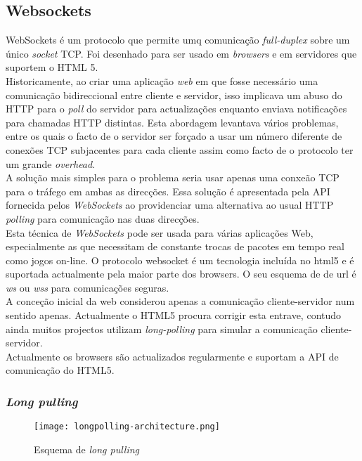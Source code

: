 \subsection{Websockets}
WebSockets é um protocolo que permite umq comunicação \textit{full-duplex} sobre um único \textit{socket} TCP. Foi desenhado para ser usado em \textit{browsers} e em servidores que suportem o HTML 5.\\
Historicamente, ao criar uma aplicação \textit{web} em que fosse necessário uma comunicação bidireccional entre cliente e servidor, isso implicava um abuso do HTTP para o \textit{poll} do servidor para actualizações enquanto enviava notificações para chamadas HTTP distintas. Esta abordagem levantava vários problemas, entre os quais o facto de o servidor ser forçado a usar um número diferente de conexões TCP subjacentes para cada cliente assim como facto de o protocolo ter um grande \textit{overhead}.\\
A solução mais simples para o problema seria usar apenas uma conxeão TCP para o tráfego em ambas as direcções. Essa solução é apresentada pela API fornecida pelos \textit{WebSockets} ao providenciar uma alternativa ao usual HTTP \textit{polling} para comunicação nas duas direcções.\\
Esta técnica de \textit{WebSockets} pode ser usada para várias aplicações Web, especialmente as que necessitam de constante trocas de pacotes em tempo real como jogos on-line. O protocolo websocket é um tecnologia incluída no html5 e é suportada actualmente pela maior parte dos browsers. O seu esquema de de url é \textit{ws} ou \textit{wss} para comunicações seguras. \\

A conceção inicial da web considerou apenas a comunicação cliente-servidor num sentido apenas. Actualmente o HTML5 procura corrigir esta entrave, contudo ainda muitos projectos utilizam \textit{long-polling} para simular a comunicação cliente-servidor.\\

Actualmente os browsers são actualizados regularmente e suportam a API de comunicação do HTML5.
\subsubsection{\textit{Long pulling}}

\begin{figure}[H]
\centering
\texttt{[image: longpolling-architecture.png]}
\caption{Esquema de \textit{long pulling}}
\label{fig:long_pulling}
\end{figure}

